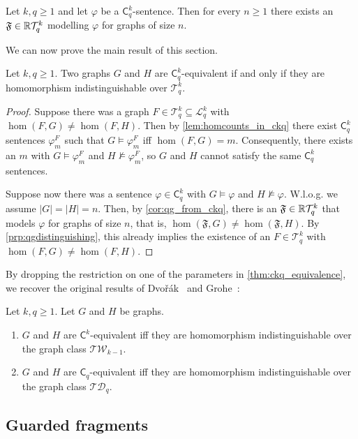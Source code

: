 \documentclass{lmcs}
\theoremstyle{plain}\newtheorem{claim}[thm]{Claim}   %
\newcommand{\RR}{\ensuremath \mathbb{R}}
\newcommand{\cL}{\ensuremath{\mathcal L}}
\newcommand{\cT}{\ensuremath{\mathcal T}}
\newcommand{\Ekq}{\ensuremath{\cT_{q}^{k}}}
\newcommand{\Lkq}{\ensuremath{\cL_{q}^{k}}}
\newcommand{\lC} {\ensuremath{\mathsf C}}
\newcommand{\qg}[1]{\ensuremath{\mathfrak{#1}}}
\renewcommand\phi\varphi
\begin{document}
\begin{cor}\label{cor:qg_from_ckq}
	Let $k, q \geq 1$ and let $\phi$ be a $\lC^k_q$-sentence.
	Then for every $n \geq 1$ there exists an $\qg{F} \in \RR\Ekq$ modelling $\phi$ for graphs of size $n$.
\end{cor}


We can now prove the main result of this section.

\begin{thm}\label{thm:ckq_equivalence}
	Let $k,q \geq 1$.
	Two graphs $G$ and $H$ are $\lC^k_q$-equivalent if and only if they are homomorphism indistinguishable over $\Ekq$.
\end{thm}
\begin{proof}
	Suppose there was a graph $F \in \Ekq \subseteq \Lkq$ with $\hom(F, G) \neq \hom(F, H)$.
	Then by \autoref{lem:homcounts_in_ckq} there exist $\lC^k_q$ sentences $\varphi^F_m$ such that $G \models \varphi^F_m$ iff $\hom(F, G) = m$.
	Consequently, there exists an $m$ with $G \models \varphi^F_m$ and $H \not\models \varphi^F_m$, so $G$ and $H$ cannot satisfy the same $\lC^k_q$ sentences.
	
	Suppose now there was a sentence $\phi \in \lC^k_q$ with $G \models \phi$ and $H \not\models \phi$.
	W.l.o.g. we assume $|G| = |H| = n$.
	Then, by \autoref{cor:qg_from_ckq}, there is an $\qg{F} \in \RR\Ekq$ that models $\phi$ for graphs of size $n$, that is, $\hom(\qg{F}, G) \neq \hom(\qg{F}, H)$.
	By \autoref{prp:qgdistinguishing}, this already implies the existence of an $F \in \Ekq$ with $\hom(F, G) \neq \hom(F, H)$.
\end{proof}

By dropping the restriction on one of the parameters in \autoref{thm:ckq_equivalence}, we recover the original results of Dvo\v{r}\'ak~\cite{Dvorak_recognizing_2010} and Grohe~\cite{Grohe_counting_2020}:

\begin{cor}
	Let $k, q \geq 1$.
	Let $G$ and $H$ be graphs.
	\begin{enumerate}
		\item $G$ and $H$ are $\lC^k$-equivalent iff they are homomorphism indistinguishable over the graph class $\mathcal{TW}_{k-1}$.
		\item $G$ and $H$ are $\lC_q$-equivalent iff they are homomorphism indistinguishable over the graph class $\mathcal{TD}_q$.
	\end{enumerate}
\end{cor}

\subsection{Guarded fragments}
\label{subsec:gckq}
\end{document}
